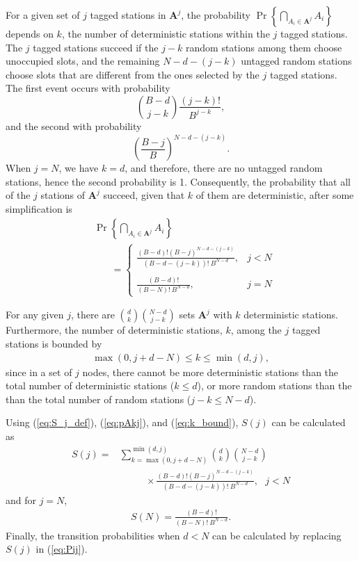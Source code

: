 \documentclass[journal]{IEEEtran}
\def\Abf{{\mathbf{A}}}
\newcommand{\pr}[1]{\Pr \left\{#1\right\}}
\begin{document}
For a given set of $j$ tagged stations in $\Abf^{j}$, the probability $\pr{\bigcap_{A_i \in \Abf^{j}} A_i}$ depends on $k$, the number of deterministic stations within the $j$ tagged stations. The $j$ tagged stations succeed if the $j-k$ random stations among them choose unoccupied slots, and the remaining $N-d-(j-k)$ untagged random stations choose slots that are different from the ones selected by the $j$ tagged stations. The first event occurs with probability $$\binom{B-d}{j-k} \frac{(j-k)!}{B^{j-k}},$$ and the second with probability $$\left(\frac{B-j}{B} \right)^{N-d-(j-k)}.$$
When $j=N$, we have $k=d$, and therefore, there are no untagged random stations, hence the second probability is 1. Consequently, the probability that all of the $j$ stations of $\Abf^{j}$ succeed, given that $k$ of them are deterministic, after some simplification is
\begin{align}
\label{eq:pAkj}
&\pr{\bigcap_{A_i \in \Abf^{j}} A_i} \\
&~~~~~~~~= \left \{ \begin{array}{lr}
    \displaystyle \frac{(B-d)!(B-j)^{N-d-(j-k)}}{\left(B-d-(j-k)\right)!~B^{N-d}}, & j < N \\&\\
    \displaystyle \frac{(B-d)!}{(B-N)!~B^{N-d}}, & j = N
\end{array}
\right. \nonumber 
\end{align}

For any given $j$, there are $\binom{d}{k} \binom{N-d}{j-k}$ sets $\Abf^{j}$ with $k$ deterministic stations. Furthermore, the number of deterministic stations, $k$, among the $j$ tagged stations is bounded by
\begin{align}
\label{eq:k_bound}
\max(0,j+d-N) \leq k \leq \min(d,j),
\end{align}
since in a set of $j$ nodes, there cannot be more deterministic stations than the total number of deterministic stations ($k \leq d$), or more random stations than the than the total number of random stations ($j-k \leq N-d$). 


Using (\ref{eq:S_j_def}), (\ref{eq:pAkj}), and (\ref{eq:k_bound}), $S(j)$ can be calculated as
\begin{align}
\label{eq:S_j}
S(j) = &\sum_{k=\max(0,j+d-N)}^{\min(d,j)}   \binom{d}{k} \binom{N-d}{j-k}\\
 & ~~~~~~~~~~~~\times \frac{(B-d)!(B-j)^{N-d-(j-k)}}{\left(B-d-(j-k)\right)!~B^{N-d}}, ~~~ j < N \nonumber 
\end{align}
and for $j=N$,
\begin{align}
\label{eq:S_N}
S(N) = \frac{(B-d)!}{(B-N)!~B^{N-d}}.
\end{align}
Finally, the transition probabilities when $d<N$ can be calculated by replacing $S(j)$ in (\ref{eq:Pij}).
\end{document}
